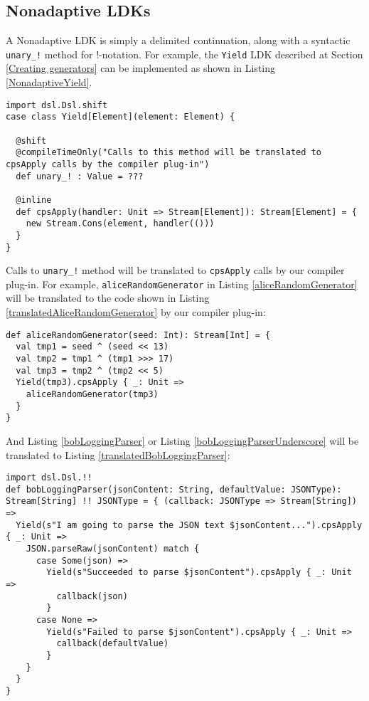 \subsection{Nonadaptive LDKs}

A Nonadaptive LDK is simply a delimited continuation, along with a syntactic \lstinline{unary_!} method for !-notation. For example, the \lstinline{Yield} LDK described at Section \ref{Creating generators} can be implemented as shown in Listing \ref{NonadaptiveYield}.

\begin{lstlisting}[caption={The \lstinline{Yield} LDK, the nonadaptive version},label={NonadaptiveYield}]
import dsl.Dsl.shift
case class Yield[Element](element: Element) {

  @shift
  @compileTimeOnly("Calls to this method will be translated to cpsApply calls by the compiler plug-in")
  def unary_! : Value = ???

  @inline
  def cpsApply(handler: Unit => Stream[Element]): Stream[Element] = {
    new Stream.Cons(element, handler(()))
  }
}
\end{lstlisting}

Calls to \lstinline{unary_!} method will be translated to \lstinline{cpsApply} calls by our compiler plug-in. For example, \lstinline{aliceRandomGenerator} in Listing \ref{aliceRandomGenerator} will be translated to the code shown in Listing \ref{translatedAliceRandomGenerator} by our compiler plug-in:

\begin{lstlisting}[caption={The translated code for Alice's pseudo-random number generator},label={translatedAliceRandomGenerator}]
def aliceRandomGenerator(seed: Int): Stream[Int] = {
  val tmp1 = seed ^ (seed << 13)
  val tmp2 = tmp1 ^ (tmp1 >>> 17)
  val tmp3 = tmp2 ^ (tmp2 << 5)
  Yield(tmp3).cpsApply { _: Unit =>
    aliceRandomGenerator(tmp3)
  }
}
\end{lstlisting}

And Listing \ref{bobLoggingParser} or Listing \ref{bobLoggingParserUnderscore} will be translated to Listing \ref{translatedBobLoggingParser}:

\begin{lstlisting}[caption={The translated code for Bob's parser},label={translatedBobLoggingParser}]
import dsl.Dsl.!!
def bobLoggingParser(jsonContent: String, defaultValue: JSONType): Stream[String] !! JSONType = { (callback: JSONType => Stream[String]) =>
  Yield(s"I am going to parse the JSON text $jsonContent...").cpsApply { _: Unit =>
    JSON.parseRaw(jsonContent) match {
      case Some(json) =>
        Yield(s"Succeeded to parse $jsonContent").cpsApply { _: Unit =>
          callback(json)
        }
      case None =>
        Yield(s"Failed to parse $jsonContent").cpsApply { _: Unit =>
          callback(defaultValue)
        }
    }
  }
}
\end{lstlisting}


